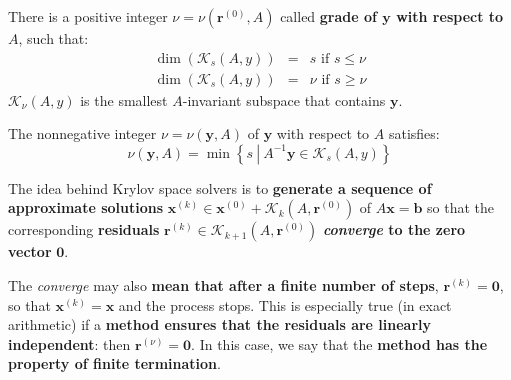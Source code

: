 \begin{lemma}
    There is a positive integer $\nu = \nu\left(\mathbf{r}^{\left(0\right)}, A\right)$ called \textbf{grade of $\mathbf{y}$ with respect to $A$}, such that:
    \begin{equation*}
        \begin{array}{rcl}
            \dim\left(\mathcal{K}_{s}\left(A, y\right)\right) &=& s \text{ if } s \le \nu\\ [.5em]
            \dim\left(\mathcal{K}_{s}\left(A, y\right)\right) &=& \nu \text{ if } s \ge \nu
        \end{array}
    \end{equation*}
    $\mathcal{K}_{\nu}\left(A, y\right)$ is the smallest $A$-invariant subspace that contains $\mathbf{y}$.
\end{lemma}

\begin{lemma}
    The nonnegative integer $\nu = \nu\left(\mathbf{y}, A\right)$ of $\mathbf{y}$ with respect to $A$ satisfies:
    \begin{equation*}
        \nu\left(\mathbf{y}, A\right) = \min\left\{
            s \: \left| \: A^{-1}\mathbf{y} \in \mathcal{K}_{s}\left(A, y\right) \right.
        \right\}
    \end{equation*}
\end{lemma}

\noindent
The idea behind Krylov space solvers is to \textbf{generate a sequence of approximate solutions} $\mathbf{x}^{\left(k\right)} \in \mathbf{x}^{\left(0\right)} + \mathcal{K}_{k}\left(A, \mathbf{r}^{\left(0\right)}\right)$ of $A\mathbf{x} = \mathbf{b}$ so that the corresponding \textbf{residuals} $\mathbf{r}^{\left(k\right)} \in \mathcal{K}_{k+1}\left(A, \mathbf{r}^{\left(0\right)}\right)$ \textbf{\emph{converge} to the zero vector} $\mathbf{0}$.

\highspace
The \emph{converge} may also \textbf{mean that after a finite number of steps}, $\mathbf{r}^{\left(k\right)} = \mathbf{0}$, so that $\mathbf{x}^{\left(k\right)} = \mathbf{x}$ and the process stops. This is especially true (in exact arithmetic) if a \textbf{method ensures that the residuals are linearly independent}: then $\mathbf{r}^{\left(\nu\right)} = \mathbf{0}$. In this case, we say that the \textbf{method has the property of finite termination}.

